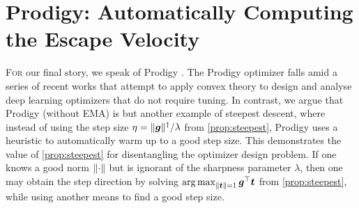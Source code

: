 \section{Prodigy: Automatically Computing the Escape Velocity}
\label{sec:prodigy}

\lettrine{F}{or} our final story, we speak of Prodigy \citep{Mishchenko2023Prodigy}. The Prodigy optimizer falls amid a series of recent works \citep{pmlr-v202-defazio23a,khaled2023dowg,Ivgi2023DoGIS} that attempt to apply convex theory to design and analyse deep learning optimizers that do not require tuning. In contrast, we argue that Prodigy (without EMA) is but another example of steepest descent, where instead of using the step size $\eta=\Vert {{\bm{g}}} \Vert^\dagger/\lambda$ from \cref{prop:steepest}, Prodigy uses a heuristic to automatically warm up to a good step size. This demonstrates the value of \cref{prop:steepest} for disentangling the optimizer design problem. If one knows a good norm $\Vert {\cdot} \Vert$ but is ignorant of the sharpness parameter $\lambda$, then one may obtain the step direction by solving $\operatorname*{arg\,max}_{\Vert {{\bm{t}}} \Vert=1} {\bm{g}}^\top {\bm{t}}$ from \cref{prop:steepest}, while using another means to find a good step size.

